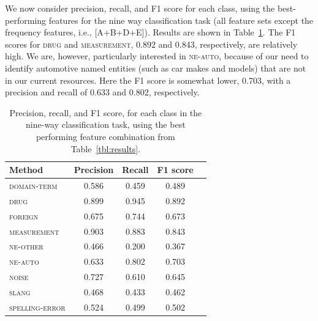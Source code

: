 \documentclass[10pt, a4paper]{article}
\newcommand{\tabref}[2][]{Table#1~\ref{#2}\xspace}
\begin{document}
We now consider precision, recall, and F1 score for each class, using
the best-performing features for the nine way classification task (all
feature sets except the frequency features, i.e., [A+B+D+E]). Results
are shown in \tabref{tbl:results-class}. The F1 scores for
\textsc{drug} and \textsc{measurement}, 0.892 and 0.843, respectively,
are relatively high. We are, however, particularly interested in
\textsc{ne-auto}, because of our need to identify automotive named
entities (such as car makes and models) that are not in our current
resources. Here the F1 score is somewhat lower, 0.703, with a
precision and recall of 0.633 and 0.802, respectively.

\begin{table}
\begin{center}
\begin{tabular}{lcccc}

\textbf{Method}& \textbf{Precision}&\textbf{Recall}
&\textbf{F1 score}\\
\hline

\textsc{domain-term} & 0.586 & 0.459 & 0.489 \\

\textsc{drug} & 0.899 & 0.945 &  0.892 \\

\textsc{foreign} & 0.675 & 0.744 &  0.673\\

\textsc{measurement} & 0.903 & 0.883 & 0.843 \\

\textsc{ne-other} & 0.466 & 0.200 & 0.367 \\ 

\textsc{ne-auto} & 0.633 & 0.802 & 0.703 \\

\textsc{noise} & 0.727 & 0.610 & 0.645 \\

\textsc{slang} & 0.468 & 0.433 & 0.462 \\

\textsc{spelling-error} & 0.524 & 0.499 &  0.502 \\

\end{tabular}
\caption{Precision, recall, and F1 score, for each class in the
  nine-way classification task, using the best performing feature
  combination from \tabref{tbl:results}.\label{tbl:results-class}}
\end{center}
\end{table}
\end{document}
